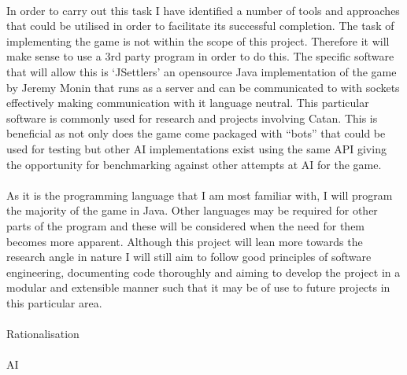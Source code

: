\documentclass[]{article}
\begin{document}
\paragraph{}
In order to carry out this task I have identified a number of tools and approaches that could be utilised in order to facilitate its successful completion. The task of implementing the game is not within the scope of this project. Therefore it will make sense to use a 3rd party program in order to do this. The specific software that will allow this is `JSettlers' an opensource Java implementation of the game by Jeremy Monin that runs as a server and can be communicated to with sockets effectively making communication with it language neutral. This particular software is commonly used for research and projects involving Catan. This is beneficial as not only does the game come packaged with ``bots'' that could be used for testing but other AI implementations exist using the same API giving the opportunity for benchmarking against other attempts at AI for the game.

\paragraph{}
As it is the programming language that I am most familiar with, I will program the majority of the game in Java. Other languages may be required for other parts of the program and these will be considered when the need for them becomes more apparent. Although this project will lean more towards the research angle in nature I will still aim to follow good principles of software engineering, documenting code thoroughly and aiming to develop the project in a modular and extensible manner such that it may be of use to future projects in this particular area. 

\paragraph{}
Rationalisation

\paragraph{}
AI
\end{document}
